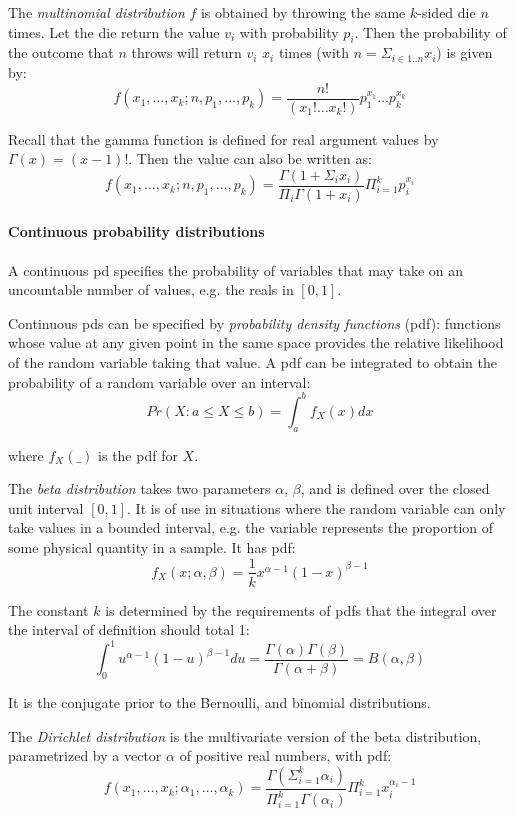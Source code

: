 \documentclass{article}
\newcommand{\Beta}{B}
\begin{document}
The {\em multinomial distribution} $f$ is obtained by throwing the same $k$-sided die $n$ times. Let the die return the value $v_i$ with probability $p_i$. Then the probability of the outcome that $n$ throws will return $v_i$ $x_i$ times (with $n=\Sigma_{i\in 1..n} x_i$) is given by:
$$
f(x_1, \ldots, x_k; n, p_1, \ldots, p_k) = \frac{n!}{(x_1!\ldots x_k!)}p_1^{x_1}\ldots p_k^{x_k}
$$

Recall that the gamma function is defined for real argument values by $\Gamma(x)=(x-1)!$. Then the value can also be written as:
$$ f(x_1, \ldots, x_k; n, p_1, \ldots, p_k)
    = \frac{\Gamma(1+\Sigma_i x_i)}{\Pi_i \Gamma(1+x_i)}\Pi_{i=1}^k p_i^{x_i}$$


\paragraph{Continuous probability distributions} 
A continuous pd specifies the probability of variables that may take on an uncountable number of values, e.g. the reals in $[0,1]$. 

Continuous pds can be specified by {\em probability density functions} (pdf): functions whose value at any given point in the same space provides the relative likelihood of the random variable taking that value. A pdf can be integrated to obtain the probability of a random variable over an interval:
$$Pr(X : a \leq X \leq b) = \int_a^b f_X(x) dx$$

\noindent where $f_X(\_)$ is the pdf for $X$.


The {\em beta distribution} takes two parameters $\alpha$, $\beta$, and is defined over the closed unit interval $[0,1]$. It is of use in situations where the random variable can only take values in a bounded interval, e.g.{} the variable represents the proportion of some physical quantity in a sample. It has pdf: 
$$ f_X(x; \alpha, \beta) = \frac{1}{k} x^{\alpha-1}(1-x)^{\beta-1}$$

The constant $k$ is determined by the requirements of pdfs that the integral over the interval of definition should total 1:
$$ \int_0^1 u^{\alpha-1}(1-u)^{\beta -1} du  = \frac{\Gamma(\alpha)\Gamma(\beta)}{\Gamma(\alpha+\beta)} = \Beta(\alpha,\beta)$$

It is the conjugate prior to the Bernoulli, and binomial distributions.


The {\em Dirichlet distribution} is the multivariate version of the beta distribution, parametrized by a vector $\alpha$ of positive real numbers, with pdf:
$$f(x_1, \ldots, x_k; \alpha_1, \ldots, \alpha_k)
  = \frac{\Gamma(\Sigma_{i=1}^k \alpha_i)}{\Pi_{i=1}^k \Gamma(\alpha_i)} \Pi_{i=1}^k x_i^{\alpha_i -1}$$
\end{document}
